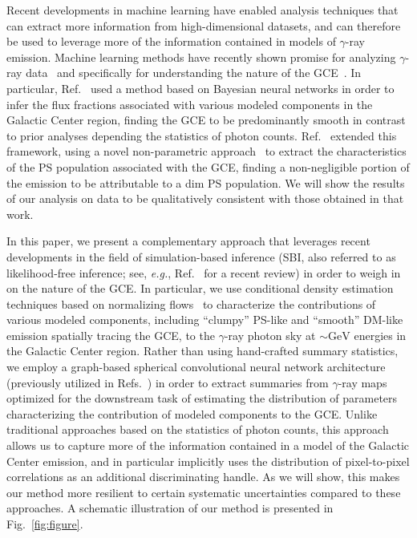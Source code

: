 \documentclass[prd,aps,10pt,nofootinbib,twocolumn,superscriptaddress,preprintnumbers,balancelastpage,longbibliography,floatfix]{revtex4-2}
\begin{document}
Recent developments in machine learning have enabled analysis techniques that can extract more information from high-dimensional datasets, and can therefore be used to leverage more of the information contained in models of $\gamma$-ray emission. Machine learning methods have recently shown promise for analyzing $\gamma$-ray data~\cite{Caron:2021map} and specifically for understanding the nature of the \Fermi GCE~\cite{List:2020mzd,List:2021aer,Caron:2017udl}. In particular, Ref.~\cite{List:2020mzd} used a method based on Bayesian neural networks in order to infer the flux fractions associated with various modeled components in the Galactic Center region, finding the GCE to be predominantly smooth in contrast to prior analyses depending the statistics of photon counts. Ref.~\cite{List:2021aer} extended this framework, using a novel non-parametric approach~\cite{List2021} to extract the characteristics of the PS population associated with the GCE, finding a non-negligible portion of the emission to be attributable to a dim PS population. We will show the results of our analysis on \Fermi data to be qualitatively consistent with those obtained in that work. 

In this paper, we present a complementary approach that leverages recent developments in the field of simulation-based inference (SBI, also referred to as likelihood-free inference; see, \emph{e.g.}, Ref.~\cite{Cranmer:2019eaq} for a recent review) in order to weigh in on the nature of the GCE. In particular, we use conditional density estimation techniques based on normalizing flows~\cite{papamakarios2019normalizing,DBLP:conf/icml/RezendeM15} to characterize the contributions of various modeled components, including ``clumpy'' PS-like and ``smooth'' DM-like emission spatially tracing the GCE, to the $\gamma$-ray photon sky at $\sim\mathrm{GeV}$ energies in the Galactic Center region. Rather than using hand-crafted summary statistics, we employ a graph-based spherical convolutional neural network architecture (previously utilized in Refs.~\cite{List:2020mzd,List:2021aer}) in order to extract summaries from $\gamma$-ray maps optimized for the downstream task of estimating the distribution of parameters characterizing the contribution of modeled components to the GCE. Unlike traditional approaches based on the statistics of photon counts, this approach allows us to capture more of the information contained in a model of the Galactic Center emission, and in particular implicitly uses the distribution of pixel-to-pixel correlations as an additional discriminating handle. As we will show, this makes our method more resilient to certain systematic uncertainties compared to these approaches. A schematic illustration of our method is presented in Fig.~\ref{fig:figure}.
\end{document}
